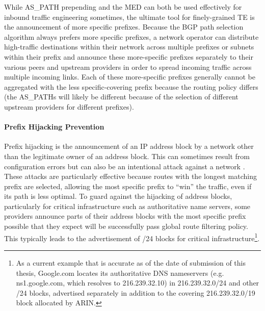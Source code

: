 While AS\_PATH prepending and the MED can both be used effectively for inbound
traffic engineering sometimes, the ultimate tool for finely-grained TE is the
announcement of more specific prefixes. Because the BGP path selection
algorithm always prefers more specific prefixes, a network operator can
distribute high-traffic destinations within their network across multiple
prefixes or subnets within their prefix and announce these more-specific
prefixes separately to their various peers and upstream providers in order to
spread incoming traffic across multiple incoming links. Each of these
more-specific prefixes generally cannot be aggregated with the less
specific-covering prefix because the routing policy differs (the AS\_PATHs will
likely be different because of the selection of different upstream providers
for different prefixes).



\paragraph{Prefix Hijacking Prevention}

Prefix hijacking is the announcement of an IP address block by a network other
than the legitimate owner of an address block. This can sometimes result from
configuration errors \cite{Brown:2008hc} but can also be an intentional attack
against a network \cite{Pilosov:2008ij}. These attacks are particularly
effective because routes with the longest matching prefix are selected,
allowing the most specific prefix to ``win'' the traffic, even if its path is
less optimal. To guard against the hijacking of address blocks, particularly
for critical infrastructure such as authoritative name servers, some providers
announce parts of their address blocks with the most specific prefix
possible that they expect will be successfully pass global route filtering
policy. This typically leads to the advertisement of /24 blocks for
critical infrastructure\footnote{As a current example that is accurate as
of the date of submission of this thesis, Google.com locates its
authoritative DNS nameservers (e.g. ns1.google.com, which resolves to
216.239.32.10) in 216.239.32.0/24 and other /24 blocks, advertised
separately in addition to the covering 216.239.32.0/19 block allocated by
ARIN.}.

